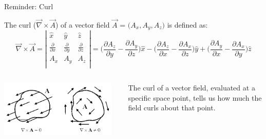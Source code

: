 %
%
%

{
\reminderslide


%
%
%

\begin{frame}{Reminder: Curl}

The curl ($\vec{\nabla} \times \vec{A}$) of a vector
field $\vec{A}$ = $\Big(A_x, A_y, A_z \Big)$ is defined as:
\begin{equation*}
     \vec{\nabla} \times \vec{A} =
       \left|
          \begin{array}{ccc}
             \hat{x} & \hat{y} & \hat{z} \\
             \frac{\partial}{\partial x}  & \frac{\partial}{\partial y} & \frac{\partial}{\partial z} \\
             A_x     & A_y     & A_z     \\
          \end{array}
       \right| =
       \Big( \frac{\partial A_z}{\partial y} - \frac{\partial A_y}{\partial z} \Big) \hat{x} -
       \Big( \frac{\partial A_z}{\partial x} - \frac{\partial A_x}{\partial z} \Big) \hat{y} +
       \Big( \frac{\partial A_y}{\partial x} - \frac{\partial A_x}{\partial y} \Big) \hat{z}
\end{equation*}

\begin{columns}
  \begin{column}{0.55\textwidth}
   \begin{center}
     \includegraphics[width=0.95\textwidth]{./images/schematics/curl_1.png}
   \end{center}
  \end{column}
  \begin{column}{0.45\textwidth}
    The curl of a vector field, evaluated at a specific space point,
    tells us how much the field curls about that point.\\
  \end{column}
\end{columns}


\end{frame}}
